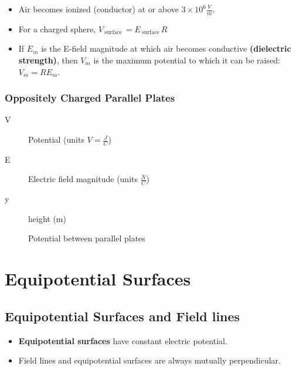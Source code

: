 \begin{itemize}
	\item Air becomes ionized (conductor) at or above $3\times 10^{6} \frac{V}{m}$.
		\item For a charged sphere, $V_{\:\text{surface}\: }= E_{\:\text{surface}\:}R$
		\item If $E_{m}$ is the E-field magnitude at which air becomes conductive
			\textbf{(dielectric strength)}, then $V_{m}$ is the maximum potential to
			which it can be raised: $V_{m} = RE_{m}$.
\end{itemize}

\subsubsection{Oppositely Charged Parallel Plates}%
\label{ssub:oppositely_charged_parallel_plates}

\begin{description}
	\item[V] Potential (units $V = \frac{J}{C}$)
	\item[E] Electric field magnitude (units $\frac{N}{C}$)
	\item[y] height (m)
\end{description}

\begin{figure}[ht]
    \centering
    \caption{Potential between parallel plates}
    \label{fig:potential-between-parallel-plates}
\end{figure}

\section{Equipotential Surfaces}%
\label{sec:equipotential_surfaces}

\subsection{Equipotential Surfaces and Field lines}%
\label{sub:equipotential_surfaces_and_field_lines}

\begin{itemize}
	\item \textbf{Equipotential surfaces} have constant electric potential.
		\item Field lines and equipotential surfaces are always mutually perpendicular.
\end{itemize}

